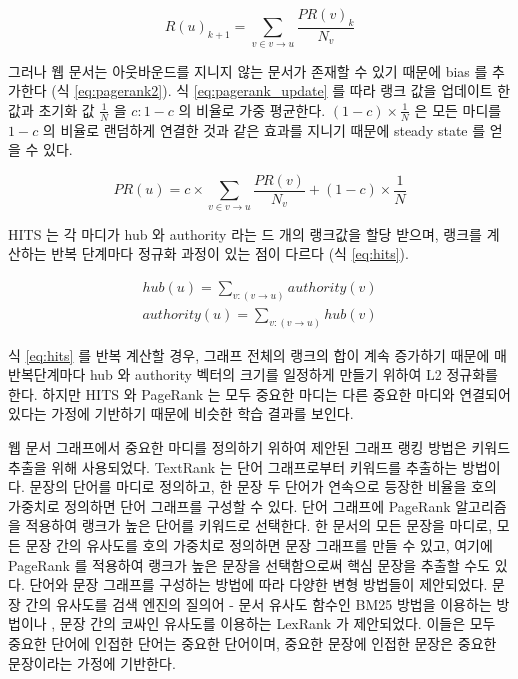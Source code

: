 \documentclass[11pt]{article}
\begin{document}
\begin{equation}
  \label{eq:pagerank_update}
  R(u)_{k+1} = \sum_{v \in v \rightarrow u} \frac{PR(v)_k}{N_v}
\end{equation}

그러나 웹 문서는 아웃바운드를 지니지 않는 문서가 존재할 수 있기 때문에 bias 를 추가한다 (식 \ref{eq:pagerank2}).
식 \ref{eq:pagerank_update} 를 따라 랭크 값을 업데이트 한 값과 초기화 값 $\frac{1}{N}$ 을 $c : 1-c$ 의 비율로 가중 평균한다.
$(1-c) \times \frac{1}{N}$ 은 모든 마디를 $1-c$ 의 비율로 랜덤하게 연결한 것과 같은 효과를 지니기 때문에 steady state 를 얻을 수 있다.

\begin{equation}
  \label{eq:pagerank2}
  PR(u) = c \times \sum_{v \in v \rightarrow u} \frac{PR(v)}{N_v} + (1-c) \times \frac{1}{N}
\end{equation}

HITS 는 각 마디가 hub 와 authority 라는 드 개의 랭크값을 할당 받으며, 랭크를 계산하는 반복 단계마다 정규화 과정이 있는 점이 다르다 (식 \ref{eq:hits}).

\begin{equation}
  \label{eq:hits}
  \begin{aligned}
  hub(u) = \sum_{v:(v \rightarrow u)} authority(v) \\
  authority(u) = \sum_{v:(v \rightarrow u)} hub(v)
  \end{aligned}
\end{equation}

식 \ref{eq:hits} 를 반복 계산할 경우, 그래프 전체의 랭크의 합이 계속 증가하기 때문에 매 반복단계마다 hub 와 authority 벡터의 크기를 일정하게 만들기 위하여 L2 정규화를 한다.
하지만 HITS 와 PageRank 는 모두 중요한 마디는 다른 중요한 마디와 연결되어 있다는 가정에 기반하기 때문에 비슷한 학습 결과를 보인다.

웹 문서 그래프에서 중요한 마디를 정의하기 위하여 제안된 그래프 랭킹 방법은 키워드 추출을 위해 사용되었다.
TextRank \citep{mihalcea2004textrank} 는 단어 그래프로부터 키워드를 추출하는 방법이다.
문장의 단어를 마디로 정의하고, 한 문장 두 단어가 연속으로 등장한 비율을 호의 가중치로 정의하면 단어 그래프를 구성할 수 있다.
단어 그래프에 PageRank 알고리즘을 적용하여 랭크가 높은 단어를 키워드로 선택한다.
한 문서의 모든 문장을 마디로, 모든 문장 간의 유사도를 호의 가중치로 정의하면 문장 그래프를 만들 수 있고, 여기에 PageRank 를 적용하여 랭크가 높은 문장을 선택함으로써 핵심 문장을 추출할 수도 있다.
단어와 문장 그래프를 구성하는 방법에 따라 다양한 변형 방법들이 제안되었다.
문장 간의 유사도를 검색 엔진의 질의어 - 문서 유사도 함수인 BM25 \citep{robertson2009probabilistic} 방법을 이용하는 방법이나 \citep{barrios2016variations}, 문장 간의 코싸인 유사도를 이용하는 LexRank \citep{erkan2004lexrank} 가 제안되었다.
이들은 모두 중요한 단어에 인접한 단어는 중요한 단어이며, 중요한 문장에 인접한 문장은 중요한 문장이라는 가정에 기반한다.
\end{document}
